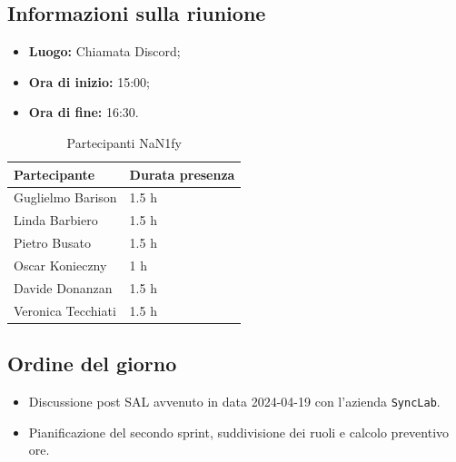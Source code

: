 \documentclass[8pt]{article}
\begin{document}
\subsection{Informazioni sulla riunione}
\begin{itemize}
	\setlength\itemsep{0em}
	\item\textbf{Luogo:} Chiamata Discord;
	\item\textbf{Ora di inizio:} 15:00;
	\item\textbf{Ora di fine:}  16:30.
\end{itemize}
\begin{table}[ht!]
	\begin{minipage}[t]{0.5\linewidth}
		\centering
		\begin{tabular}{p{3cm} p{3cm}}
			\toprule
			\textbf{Partecipante} & \textbf{Durata presenza} \\
			\midrule
			Guglielmo Barison & 1.5 h \\
			Linda Barbiero &  1.5 h \\
			Pietro Busato & 1.5 h \\
			Oscar Konieczny & 1 h \\
			Davide Donanzan & 1.5 h \\
			Veronica Tecchiati & 1.5 h \\
			\bottomrule
		\end{tabular}
		\caption{Partecipanti NaN1fy}
		\label{table:Partecipanti NaN1fy}
	\end{minipage}
\end{table}
\subsection{Ordine del giorno}
\begin{itemize}
	\setlength\itemsep{0em}
	\item Discussione post SAL avvenuto in data 2024-04-19 con l'azienda \texttt{SyncLab}.
	\item Pianificazione del secondo sprint, suddivisione dei ruoli e calcolo preventivo ore.
\end{itemize}
\end{document}

